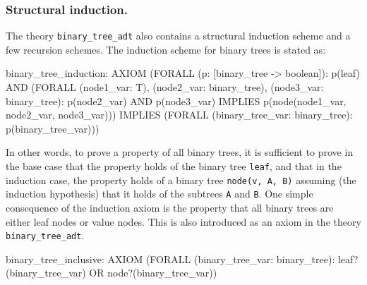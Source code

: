 \documentclass[11pt,twoside]{book}
\begin{document}
\subsubsection{Structural induction. } The theory \texttt{binary\_tree\_adt} also
contains a structural induction scheme 
and a few recursion schemes.  The induction scheme for binary trees is
stated as:
\begin{session*}
  binary_tree_induction: AXIOM
    (FORALL (p: [binary_tree -> boolean]):
       p(leaf)
         AND
         (FORALL (node1_var: T), (node2_var: binary_tree),
                 (node3_var: binary_tree): p(node2_var) AND p(node3_var)
              IMPLIES p(node(node1_var, node2_var, node3_var)))
         IMPLIES (FORALL (binary_tree_var: binary_tree): p(binary_tree_var)))
\end{session*}
In other words, to prove a property of all binary trees, it is
sufficient to prove in the base case that the property holds of the
binary tree \texttt{leaf}, and that in the induction case, the property holds
of a binary tree \texttt{node(v, A, B)} assuming (the induction
hypothesis) that it holds of the subtrees \texttt{A} and \texttt{B}.
One simple consequence of the induction axiom is the property that
all binary trees are either leaf nodes or value nodes.  This is
also introduced as an axiom in the theory \texttt{binary\_tree\_adt}\@.
\begin{session*}
  binary_tree_inclusive: AXIOM
    (FORALL (binary_tree_var: binary_tree):
       leaf?(binary_tree_var) OR node?(binary_tree_var))
\end{session*}
\end{document}
